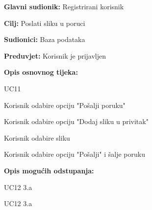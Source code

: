 \noindent {}
\begin{packed_item}
	
	\item \textbf{Glavni sudionik: }Registrirani korisnik
	\item  \textbf{Cilj:} Poslati sliku u poruci
	\item  \textbf{Sudionici:} Baza podataka
	\item  \textbf{Preduvjet:} Korisnik je prijavljen
	\item  \textbf{Opis osnovnog tijeka:}
	
	\item[] \begin{packed_enum}
		
		\item UC11
		\item Korisnik odabire opciju "Pošalji poruku"
		\item Korisnik odabire opciju "Dodaj sliku u privitak"
		\item Korisnik odabire sliku
		\item Korisnik odabire opciju "Pošalji" i šalje poruku
		
		
	\end{packed_enum}
	
	\item  \textbf{Opis mogućih odstupanja:}
	
	\item[] \begin{packed_item}
		
		\item[4.a] UC12 3.a
		\item[5.a] UC12 3.a
		
		
	\end{packed_item}
\end{packed_item}


